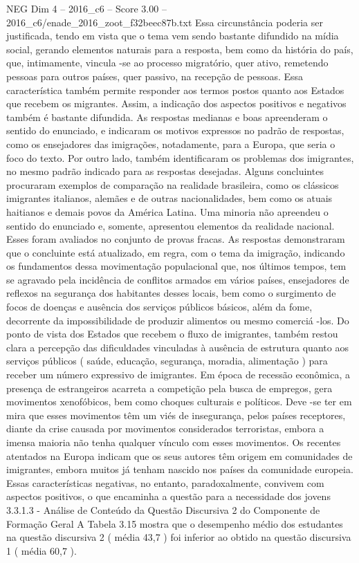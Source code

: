 \begin{textsample}{NEG Dim 4 – 2016\_c6 – Score 3.00 – 2016\_c6/enade\_2016\_zoot\_f32beec87b.txt}
Essa circunstância poderia ser justificada, tendo em vista que o tema vem sendo bastante difundido na mídia social, gerando elementos naturais para a resposta, bem como da história do país, que, intimamente, vincula -se ao processo migratório, quer ativo, remetendo pessoas para outros países, quer passivo, na recepção de pessoas.
Essa característica também permite responder aos termos postos quanto aos Estados que recebem os migrantes.
Assim, a indicação dos aspectos positivos e negativos também é bastante difundida.
As respostas medianas e boas apreenderam o sentido do enunciado, e indicaram os motivos expressos no padrão de respostas, como os ensejadores das imigrações, notadamente, para a Europa, que seria o foco do texto.
Por outro lado, também identificaram os problemas dos imigrantes, no mesmo padrão indicado para as respostas desejadas.
Alguns concluintes procuraram exemplos de comparação na realidade brasileira, como os clássicos imigrantes italianos, alemães e de outras nacionalidades, bem como os atuais haitianos e demais povos da América Latina.
Uma minoria não apreendeu o sentido do enunciado e, somente, apresentou elementos da realidade nacional.
Esses foram avaliados no conjunto de provas fracas.
As respostas demonstraram que o concluinte está atualizado, em regra, com o tema da imigração, indicando os fundamentos dessa movimentação populacional que, nos últimos tempos, tem se agravado pela incidência de conflitos armados em vários países, ensejadores de reflexos na segurança dos habitantes desses locais, bem como o surgimento de focos de doenças e ausência dos serviços públicos básicos, além da fome, decorrente da impossibilidade de produzir alimentos ou mesmo comerciá -los.
Do ponto de vista dos Estados que recebem o fluxo de imigrantes, também restou clara a percepção das dificuldades vinculadas à ausência de estrutura quanto aos serviços públicos ( saúde, educação, segurança, moradia, alimentação ) para receber um número expressivo de imigrantes.
Em época de recessão econômica, a presença de estrangeiros acarreta a competição pela busca de empregos, gera movimentos xenofóbicos, bem como choques culturais e políticos.
Deve -se ter em mira que esses movimentos têm um viés de insegurança, pelos países receptores, diante da crise causada por movimentos considerados terroristas, embora a imensa maioria não tenha qualquer vínculo com esses movimentos.
Os recentes atentados na Europa indicam que os seus autores têm origem em comunidades de imigrantes, embora muitos já tenham nascido nos países da comunidade europeia.
Essas características negativas, no entanto, paradoxalmente, convivem com aspectos positivos, o que encaminha a questão para a necessidade dos jovens 3.3.1.3 - Análise de Conteúdo da Questão Discursiva 2 do Componente de Formação Geral A Tabela 3.15 mostra que o desempenho médio dos estudantes na questão discursiva 2 ( média 43,7 ) foi inferior ao obtido na questão discursiva 1 ( média 60,7 ).

\end{textsample}

